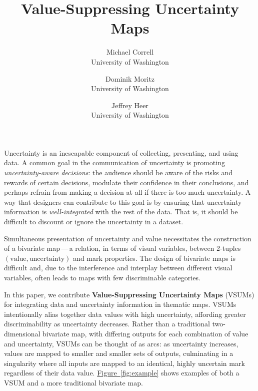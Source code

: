 \documentclass{vgtc}                          %
\title{Value-Suppressing Uncertainty Maps}
\author{Michael Correll\\ %
        \scriptsize University of Washington %
\and Dominik Moritz\\ %
     \scriptsize University of Washington %
\and Jeffrey Heer\\ %
     \scriptsize University of Washington}
\newcommand{\figref}[1]{\hyperref[#1]{Figure~\ref*{#1}}}
\begin{document}


\maketitle




Uncertainty is an inescapable component of collecting, presenting, and using data. A common goal in the communication of uncertainty is promoting \emph{uncertainty-aware decisions}: the audience should be aware of the risks and rewards of certain decisions, modulate their confidence in their conclusions, and perhaps refrain from making a decision at all if there is too much uncertainty.  A way that designers can contribute to this goal is by ensuring that uncertainty information is \emph{well-integrated} with the rest of the data. That is, it should be difficult to discount or ignore the uncertainty in a dataset.

Simultaneous presentation of uncertainty and value necessitates the construction of a bivariate map\,---\,a relation, in terms of visual variables, between 2-tuples $(\text{value}, \text{uncertainty})$ and mark properties. The design of bivariate maps is difficult and, due to the interference and interplay between different visual variables, often leads to maps with few discriminable categories.

In this paper, we contribute \textbf{Value-Suppressing Uncertainty Maps} (VSUMs) for integrating data and uncertainty information in thematic maps. VSUMs intentionally alias together data values with high uncertainty, affording greater discriminability as uncertainty decreases. Rather than a traditional two-dimensional bivariate map, with differing outputs for each combination of value and uncertainty, VSUMs can be thought of as arcs: as uncertainty increases, values are mapped to smaller and smaller sets of outputs, culminating in a singularity where all inputs are mapped to an identical, highly uncertain mark regardless of their data value. \figref{fig:example} shows examples of both a VSUM and a more traditional bivariate map.
\end{document}
